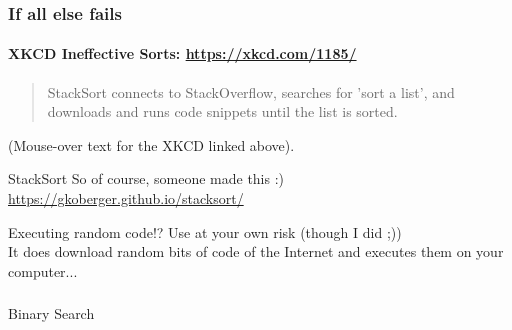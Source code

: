 \begin{frame}
	\frametitle{If all else fails}
	\framesubtitle{XKCD Ineffective Sorts: \url{https://xkcd.com/1185/}}
	\begin{quote}
		StackSort connects to StackOverflow, searches for 'sort a list', and downloads and runs code snippets until the list is sorted.
	\end{quote}
	(Mouse-over text for the XKCD linked above).
	\pause
		\begin{block}{StackSort}
			So of course, someone made this :)\\
			\url{https://gkoberger.github.io/stacksort/}
		\end{block}	
			\begin{block}{Executing random code!?}
				Use at your own risk (though I did ;))\\
				It does download random bits of code of the Internet and executes them on your computer...
			\end{block}	

	
\end{frame}


\begin{frame}[fragile]\frametitle{}
\begin{center}
{\Large Binary Search}
\end{center}

\end{frame}



